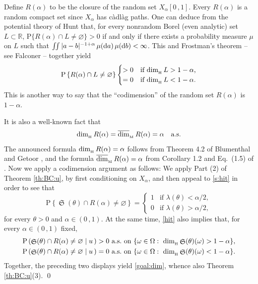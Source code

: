\documentclass[reqno]{amsart}
\DeclareMathOperator{\dimh}{dim_{_{\rm H}}}
\DeclareMathOperator{\dimm}{\overline{dim}_{_{\rm M}}}
\DeclareMathOperator{\fS}{\mathfrak S}
\newcommand{\<}{\langle}
\renewcommand{\>}{\rangle}
\newcommand{\R}{\mathbb{R}}
\renewcommand{\P}{\mathrm{P}}
\newcommand{\1}{\mathbb{1}}
\renewcommand{\d}{{\rm d}}
\theoremstyle{definition}
\numberwithin{equation}{section}
\begin{document}
Define $R(\alpha)$ to be the closure of the random set
$X_\alpha[0\,,1]$. Every $R(\alpha)$ is a random compact set since
$X_\alpha$ has c\`adl\`ag paths.
One can deduce from the potential theory of Hunt \cite{Hunt12,Hunt3}
that,  for every nonrandom Borel
(even analytic) set $L\subset\R$,
$\P\{ R(\alpha)\cap L\neq\varnothing\}>0$ if and only if
there exists a probability measure $\mu$ on $L$ such that
$\iint |a-b|^{-1+\alpha}\,\mu(\d a)\,\mu(\d b)<\infty$.
This and Frostman's theorem -- see Falconer \cite{Falconer} -- together yield
\begin{equation}\label{hit}
	\P\left\{ R(\alpha)\cap L\neq \varnothing\right\}
	\begin{cases}
		>0&\text{if $\dimh L>1-\alpha$,}\\
		=0&\text{if $\dimh L<1-\alpha$}.
	\end{cases}
\end{equation}
This is another way to say that  the ``codimension'' of the random set
$R(\alpha)$ is $1-\alpha$.

It is also a well-known fact that
\begin{equation}\label{s:hit}
	\dimh R(\alpha) = \dimm R(\alpha) = \alpha\quad\text{a.s.}
\end{equation}
The announced formula $\dimh R(\alpha) = \alpha$ follows from
Theorem 4.2 of Blumenthal and Getoor
\cite{BlumenthalGetoor}, and the formula $\dimm R(\alpha) = \alpha$
from Corollary 1.2 and Eq.~(1.5) of \cite{KSX12}.
Now we apply a codimension argument as follows: We apply
Part (2) of Theorem \ref{th:BC:u},
by first conditioning on $X_\alpha$, and then appeal to \eqref{s:hit} in order to see that
\[
	\P\left\{ \fS(\theta) \cap R(\alpha)\neq\varnothing \right\} =
	\begin{cases}
		1&\text{if $\lambda(\theta) < \alpha/2$},\\
		0&\text{if $\lambda(\theta) > \alpha/2$},
	\end{cases}
\]
for every $\theta>0$ and $\alpha\in(0\,,1)$. At the same time, 
\eqref{hit} also implies that, for every $\alpha\in(0\,,1)$ fixed,
\begin{align*}
	&\P\left( \fS(\theta) \cap R(\alpha)\neq\varnothing 
		\mid u\, \right)>0~\text{a.s.~on 
		$\left\{\omega\in\Omega:\ \dimh \fS(\theta)(\omega)>1-\alpha\right\}$},\\
	&\P\left(\fS(\theta) \cap R(\alpha)\neq\varnothing 
		\mid u\, \right)=0~\text{a.s.~on
		$\left\{\omega\in\Omega:\ \dimh \fS(\theta)(\omega)<1-\alpha\right\}$}.
\end{align*}
Together, the preceding two displays yield \eqref{goal:dim},
whence also Theorem \ref{th:BC:u}(3).
\qed










	
\end{document}
